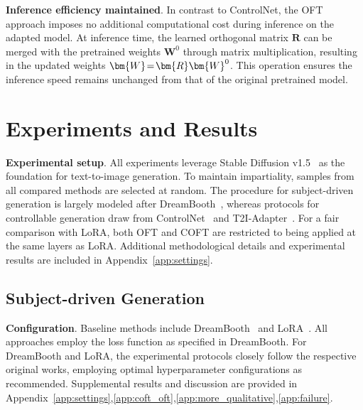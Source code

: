 \textbf{Inference efficiency maintained}. In contrast to ControlNet, the OFT approach imposes no additional computational cost during inference on the adapted model. At inference time, the learned orthogonal matrix $\bm{R}$ can be merged with the pretrained weights $\bm{W}^0$ through matrix multiplication, resulting in the updated weights $\thickmuskip=2mu \medmuskip=2mu \bm{W}=\bm{R}\bm{W}^0$. This operation ensures the inference speed remains unchanged from that of the original pretrained model.

\section{Experiments and Results}

\textbf{Experimental setup}. All experiments leverage Stable Diffusion v1.5~\cite{rombach2022high} as the foundation for text-to-image generation. To maintain impartiality, samples from all compared methods are selected at random. The procedure for subject-driven generation is largely modeled after DreamBooth~\cite{ruiz2023dreambooth}, whereas protocols for controllable generation draw from ControlNet~\cite{zhang2023adding} and T2I-Adapter~\cite{mou2023t2i}. For a fair comparison with LoRA, both OFT and COFT are restricted to being applied at the same layers as LoRA. Additional methodological details and experimental results are included in Appendix~\ref{app:settings}.

\subsection{Subject-driven Generation}

\textbf{Configuration}. Baseline methods include DreamBooth~\cite{ruiz2023dreambooth} and LoRA~\cite{hulora2022}. All approaches employ the loss function as specified in DreamBooth. For DreamBooth and LoRA, the experimental protocols closely follow the respective original works, employing optimal hyperparameter configurations as recommended. Supplemental results and discussion are provided in Appendix~\ref{app:settings},\ref{app:coft_oft},\ref{app:more_qualitative},\ref{app:failure}.

